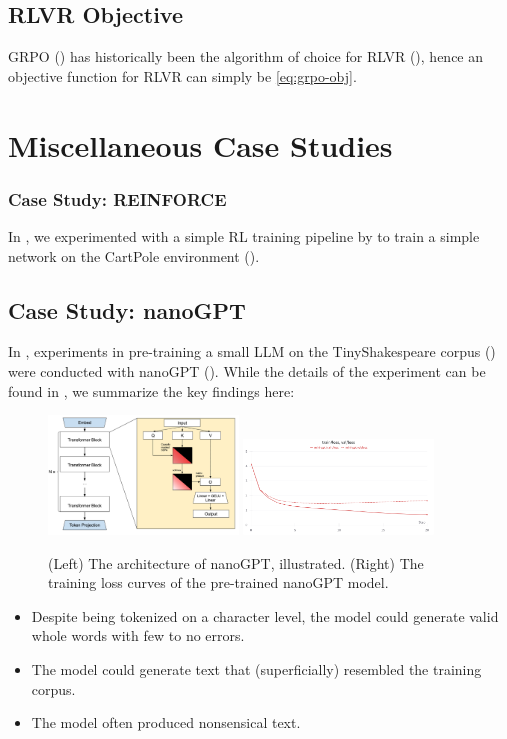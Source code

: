 \documentclass{article} %
\theoremstyle{definition}
\begin{document}
\subsection{RLVR Objective}
\label{sec:rlvr-obj}

GRPO (\cite{grpo}) has historically been the algorithm of choice for RLVR (\cite{r1, grpo}),
hence an objective function for RLVR can simply be \ref{eq:grpo-obj}.

\section{Miscellaneous Case Studies}

\subsubsection{Case Study: REINFORCE} \label{sec:cs-reinforce}
In \cite{wk3}, we experimented with a simple RL training pipeline by 
\cite{Levine-et-al-2023} to train a simple network on the CartPole environment (\cite{Towers-et-al-2024}).
 
\subsection{Case Study: nanoGPT} \label{sec:cs-nanogpt}
In \cite{wk8}, experiments in pre-training a small LLM on the TinyShakespeare corpus (\cite{tinyss, tinyss2}) were
conducted with nanoGPT (\cite{nanoGPT}). While the details of the experiment can be found in \cite{wk8},
we summarize the key findings here:
\begin{figure}
    \centering
    \includegraphics[width=0.45\textwidth, height=0.15\textheight]{images/gpt_arch.png}
    \includegraphics[width=0.45\textwidth, height=0.15\textheight]{images/loss_curves.png}
    \caption{(Left) The architecture of nanoGPT, illustrated. (Right) The training loss curves of the pre-trained nanoGPT model.}
    \label{fig:nanoGPT-sample}
\end{figure}
\begin{itemize}
    \item Despite being tokenized on a character level, the model could generate valid whole words
         with few to no errors.
    \item The model could generate text that (superficially) resembled the training corpus.
    \item The model often produced nonsensical text.
\end{itemize}
\end{document}
